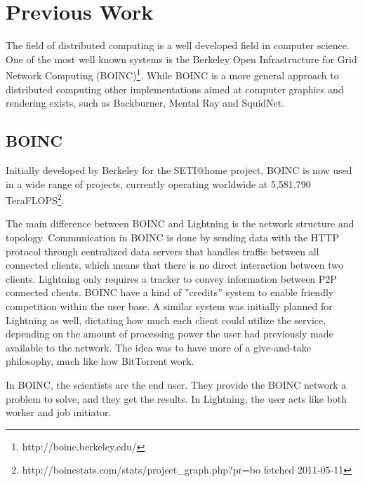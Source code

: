 \chapter{Previous Work}
The field of distributed computing is a well developed field in computer
science. One of the most well known systems is the Berkeley Open Infrastructure
for Grid Network Computing (BOINC)\footnote{http://boinc.berkeley.edu/}.
While BOINC is a more general approach to distributed computing other 
implementations aimed at computer graphics and rendering exists, such as Backburner, Mental Ray and SquidNet.


\section{BOINC}
Initially developed by Berkeley for the SETI@home project, BOINC is now used in
a wide range of projects, currently operating worldwide at 5,581.790 
TeraFLOPS\footnote{http://boincstats.com/stats/project\_graph.php?pr=bo 
fetched 2011-05-11}.

The main difference between BOINC and Lightning is the network structure and topology.
Communication in BOINC is done by sending data with the HTTP protocol through centralized data
servers that handles traffic between all connected clients, which means 
that there is no direct interaction between two clients. Lightning only
requires a tracker to convey information between P2P connected clients.
BOINC have a kind of ''credits'' system to enable friendly competition within the user base.
A similar system was initially planned for Lightning as well, dictating how much each client
could utilize the service, depending on the amount of processing power the user had previously
made available to the network. The idea was to have more of a give-and-take philosophy, much
like how BitTorrent work.

In BOINC, the scientists are the end user. They provide the BOINC network a problem to solve,
and they get the results. In Lightning, the user acts like both worker and job initiator.


